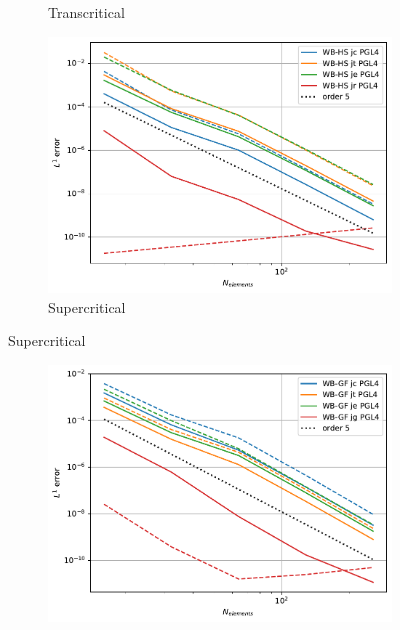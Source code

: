\documentclass[pt12]{beamer}
\begin{document}
\begin{frame}[label=NumericalResultsWithoutWBmonodimensionalcasesSW]
\begin{figure}
\begin{subfigure}[b]{0.30\textwidth}
         \caption{Transcritical}
         \label{convergence_comp_jumps_trans}
     \end{subfigure}
     \begin{subfigure}[b]{0.30\textwidth}
         \centering
         \includegraphics[width=\textwidth]{alb_sup_convergenceWB-HS.pdf}
		\caption{Supercritical}              
         \label{convergence_comp_jumps_super}
     \end{subfigure}
\end{figure}
%
\begin{figure}
     \centering
     \begin{subfigure}[b]{0.30\textwidth}
         \centering
         \includegraphics[width=\textwidth]{alb_sub_convergenceWB-GF.pdf}

\end{subfigure}
\end{figure}
\end{frame}
\end{document}
